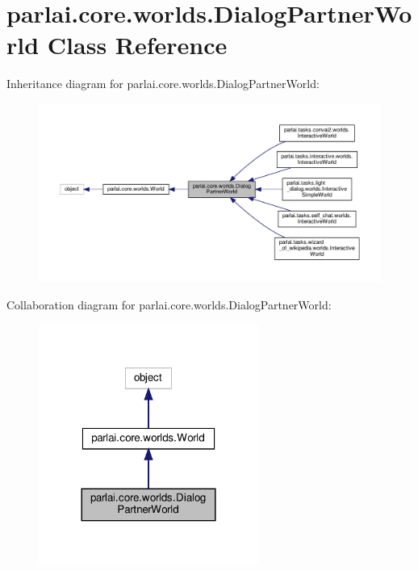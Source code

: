 \hypertarget{classparlai_1_1core_1_1worlds_1_1DialogPartnerWorld}{}\section{parlai.\+core.\+worlds.\+Dialog\+Partner\+World Class Reference}
\label{classparlai_1_1core_1_1worlds_1_1DialogPartnerWorld}


Inheritance diagram for parlai.\+core.\+worlds.\+Dialog\+Partner\+World\+:
\nopagebreak
\begin{figure}[H]
\begin{center}
\leavevmode
\includegraphics[width=350pt]{classparlai_1_1core_1_1worlds_1_1DialogPartnerWorld__inherit__graph}
\end{center}
\end{figure}


Collaboration diagram for parlai.\+core.\+worlds.\+Dialog\+Partner\+World\+:
\nopagebreak
\begin{figure}[H]
\begin{center}
\leavevmode
\includegraphics[width=204pt]{classparlai_1_1core_1_1worlds_1_1DialogPartnerWorld__coll__graph}
\end{center}
\end{figure}
